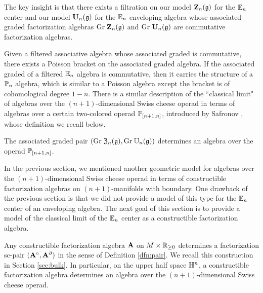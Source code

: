 \documentclass[11pt]{amsart}
\numberwithin{equation}{section}
\begin{document}
The key insight is that there exists a filtration on our model $\mathbf Z_n(\mathfrak g)$ for the $\mathbb E_n$ center and our model $\mathbf U_n (\mathfrak g)$ for the $\mathbb E_n$ enveloping algebra  whose associated graded factorization algebras ${\rm Gr} \; \mathbf Z_n(\mathfrak g)$ and ${\rm Gr} \; \mathbf U_n(\mathfrak g)$ are commutative factorization algebras. 

Given a filtered associative algebra whose associated graded is commutative, there exists a Poisson bracket on the associated graded algebra. 
If the associated graded of a filtered $\mathbb E_n$ algebra is commutative, then it carries the structure of a $\mathbb P_n$ algebra, which is similar to a Poisson algebra except the bracket is of cohomological degree $1-n$. 
There is a similar description of the ``classical limit"  of algebras over the $(n+1)$-dimensional Swiss cheese operad in terms of algebras over a certain two-colored operad $\mathbb P_{[n+1,n]}$, introduced by Safronov \cite{Pavel1, Pavel2}, whose definition we recall below.

\begin{prp} 
\label{prp:poisson}
The associated graded pair $({\rm Gr} \; \mathfrak Z_n(\mathfrak g) , {\rm Gr} \; \mathbb U_n(\mathfrak g))$ determines an algebra over the operad $\mathbb P_{[n+1,n]}$. 
\end{prp}



In the previous section, we mentioned another geometric model for algebras over the $(n+1)$-dimensional Swiss cheese operad in terms of constructible factorization algebras on $(n+1)$-manifolds with boundary.
One drawback of the previous section is that we did not provide a model of this type for the $\mathbb E_n$ center of an enveloping algebra. 
The next goal of this section is to provide a model of the classical limit of the $\mathbb E_n$ center as a constructible factorization algebra. 

Any constructible factorization algebra $\mathbf A$ on $M \times \mathbb R_{\geq 0}$ determines a factorization sc-pair $(\mathbf A^\circ , \mathbf A^{\partial})$ in the sense of Definition \ref{dfn:pair}.
We recall this construction in Section \ref{sec:bulk}. 
In particular, on the upper half space $\mathbb H^n$, a constructible factorization algebra determines an algebra over the $(n+1)$-dimensional Swiss cheese operad. 
\end{document}
